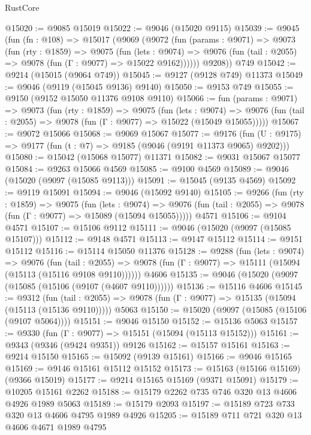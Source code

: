 \begin{lexlean}{RustCore}
\begin{coremodule}
@15020 := @9085 @15019
@15022 := @9046 (@15020 @9115)
@15039 := @9045
    (fun (fn : @108) =>
    @15017
      (@9069
        (@9072
          (fun (params : @9071) =>
          @9073
            (fun (rty : @1859) =>
            @9075
              (fun (lets : @9074) =>
              @9076 (fun (tail : @2055) => @9078 (fun (Γ : @9077) => @15022 @9162))))))
        @9208))
    @749
@15042 := @9214 (@15015 (@9064 @749))
@15045 := @9127 (@9128 @749) @11373
@15049 := @9046 (@9119 (@15045 @9136) @9140)
@15050 := @9153 @749
@15055 := @9150 (@9152 @15050 @11376 @9108 @9110)
@15066 := fun (params : @9071) =>
  @9073
    (fun (rty : @1859) =>
    @9075
      (fun (lets : @9074) =>
      @9076 (fun (tail : @2055) => @9078 (fun (Γ : @9077) => @15022 (@15049 @15055)))))
@15067 := @9072 @15066
@15068 := @9069 @15067
@15077 := @9176
    (fun (U : @9175) => @9177 (fun (t : @7) => @9185 (@9046 (@9191 @11373 @9065) @9202)))
@15080 := @15042 (@15068 @15077) @11371
@15082 := @9031 @15067 @15077
@15084 := @9263 @15066 @4569
@15085 := @9100 @4569
@15089 := @9046 (@15020 (@9097 (@15085 @9113)))
@15091 := @15045 (@9135 @4569)
@15092 := @9119 @15091
@15094 := @9046 (@15092 @9140)
@15105 := @9266
    (fun (rty : @1859) =>
    @9075
      (fun (lets : @9074) =>
      @9076 (fun (tail : @2055) => @9078 (fun (Γ : @9077) => @15089 (@15094 @15055)))))
    @4571
@15106 := @9104 @4571
@15107 := @15106 @9112
@15111 := @9046 (@15020 (@9097 (@15085 @15107)))
@15112 := @9148 @4571
@15113 := @9147 @15112
@15114 := @9151 @15112
@15116 := @15114 @15050 @11376
@15128 := @9288
    (fun (lets : @9074) =>
    @9076
      (fun (tail : @2055) =>
      @9078 (fun (Γ : @9077) => @15111 (@15094 (@15113 (@15116 @9108 @9110))))))
    @4606
@15135 := @9046 (@15020 (@9097 (@15085 (@15106 (@9107 (@4607 @9110))))))
@15136 := @15116 @4606
@15145 := @9312
    (fun (tail : @2055) => @9078 (fun (Γ : @9077) => @15135 (@15094 (@15113 (@15136 @9110)))))
    @5063
@15150 := @15020 (@9097 (@15085 (@15106 (@9107 @5064))))
@15151 := @9046 @15150
@15152 := @15136 @5063
@15157 := @9330 (fun (Γ : @9077) => @15151 (@15094 (@15113 @15152)))
@15161 := @9343 (@9346 (@9424 @9351)) @9126
@15162 := @15157 @15161
@15163 := @9214 @15150
@15165 := @15092 (@9139 @15161)
@15166 := @9046 @15165
@15169 := @9146 @15161 @15112 @15152
@15173 := @15163 (@15166 @15169) (@9366 @15019)
@15177 := @9214 @15165 @15169 (@9371 @15091)
@15179 := @10205 @15161 @2262
@15188 := @15179 @2262 @735 @746 @320 @13 @4606 @4926 @1989 @5063
@15189 := @15179 @2093
@15197 := @15189 @723 @733 @320 @13 @4606 @4795 @1989 @4926
@15205 := @15189 @711 @721 @320 @13 @4606 @4671 @1989 @4795

\end{coremodule}
\end{lexlean}

